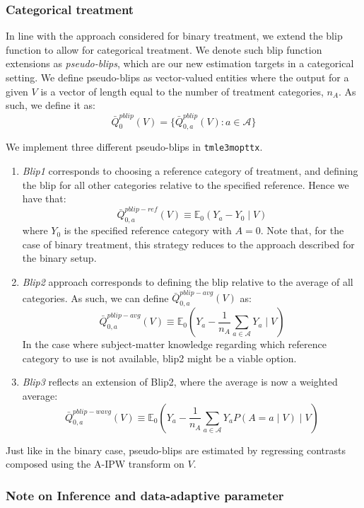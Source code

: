 \documentclass[12pt, krantz2,]{krantz}
\theoremstyle{definition}
\theoremstyle{definition}
\theoremstyle{definition}
\newcommand{\E}{\mathbb{E}}
\newcommand{\1}{\mathbbm{1}}
\begin{document}
\hypertarget{categorical-treatment}{%
\subsubsection{Categorical treatment}\label{categorical-treatment}}

In line with the approach considered for binary treatment, we extend the blip
function to allow for categorical treatment. We denote such blip function
extensions as \emph{pseudo-blips}, which are our new estimation targets in a
categorical setting. We define pseudo-blips as vector-valued entities where the
output for a given \(V\) is a vector of length equal to the number of treatment
categories, \(n_A\). As such, we define it as:
\[\bar{Q}_0^{pblip}(V) = \{\bar{Q}_{0,a}^{pblip}(V): a \in \mathcal{A} \}\]

We implement three different pseudo-blips in \texttt{tmle3mopttx}.

\begin{enumerate}
\def\labelenumi{\arabic{enumi}.}
\item
  \emph{Blip1} corresponds to choosing a reference category of treatment, and
  defining the blip for all other categories relative to the specified
  reference. Hence we have that:
  \[\bar{Q}_{0,a}^{pblip-ref}(V) \equiv \E_0(Y_a-Y_0 \mid V)\] where \(Y_0\) is
  the specified reference category with \(A=0\). Note that, for the case of
  binary treatment, this strategy reduces to the approach described for the
  binary setup.
\item
  \emph{Blip2} approach corresponds to defining the blip relative to the average of
  all categories. As such, we can define \(\bar{Q}_{0,a}^{pblip-avg}(V)\) as:
  \[\bar{Q}_{0,a}^{pblip-avg}(V) \equiv \E_0(Y_a - \frac{1}{n_A} \sum_{a \in
    \mathcal{A}} Y_a \mid V)\]
  In the case where subject-matter knowledge regarding which reference category
  to use is not available, blip2 might be a viable option.
\item
  \emph{Blip3} reflects an extension of Blip2, where the average is now a weighted
  average:
  \[\bar{Q}_{0,a}^{pblip-wavg}(V) \equiv \E_0(Y_a - \frac{1}{n_A} \sum_{a \in
    \mathcal{A}} Y_{a} P(A=a \mid V) \mid V)\]
\end{enumerate}

Just like in the binary case, pseudo-blips are estimated by regressing contrasts
composed using the A-IPW transform on \(V\).

\hypertarget{note-on-inference-and-data-adaptive-parameter}{%
\subsubsection{Note on Inference and data-adaptive parameter}\label{note-on-inference-and-data-adaptive-parameter}}
\end{document}
